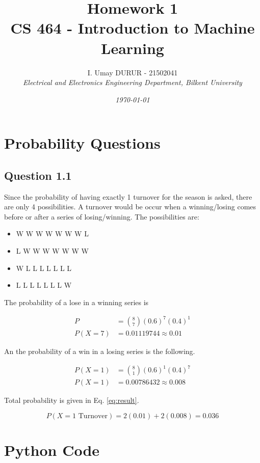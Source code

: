 \documentclass[12pt]{article}
\title{Homework 1 \\
  \large CS 464 - Introduction to Machine Learning \onehalfspacing}
\author{\small I. Umay DURUR - 21502041\\ \textit{\small Electrical and Electronics Engineering Department, Bilkent University}}
\date{\small \textit{\today}}
\newcommand\tab[1][1cm]{\hspace*{#1}}
\begin{document}
\onehalfspacing
\maketitle
\tableofcontents
\listoffigures
\listoftables

\newpage

\doublespacing
\section{Probability Questions}

\subsection*{Question 1.1}
\tab Since the probability of having exactly 1 turnover for the season is asked, there are only 4 possibilities. A turnover would be occur when a winning/losing comes before or after a series of losing/winning. The possibilities are:
\begin{itemize}
\item W W W W W W W L
\item L W W W W W W W
\item W L L L L L L L
\item L L L L L L L W
\end{itemize}

The probability of a lose in a winning series is

\begin{align*}
P &= {8 \choose 7}(0.6)^{7}(0.4)^{1} \\
P(X = 7) &= 0.01119744 \approx 0.01
\end{align*}

An the probability of a win in a losing series is the following.

\begin{align*}
P(X=1) &= {8 \choose 1}(0.6)^{1}(0.4)^{7} \\
P(X=1) &= 0.00786432 \approx 0.008
\end{align*}

Total probability is given in Eq. \ref{eq:result}. 

\begin{equation}\label{eq:result}
P(X=\text{1 Turnover}) = 2(0.01) + 2(0.008) = 0.036
\end{equation}




\appendix
\section{Python Code}

\begin{lstlisting}

\end{lstlisting}
\end{document}

